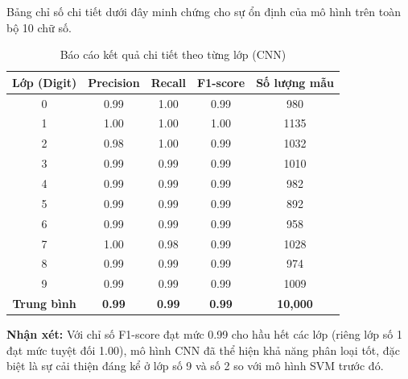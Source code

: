 \documentclass[../DoAn.tex]{subfiles}
\begin{document}
Bảng chỉ số chi tiết dưới đây minh chứng cho sự ổn định của mô hình trên toàn bộ 10 chữ số.

\begin{table}[H]
\centering
\caption{Báo cáo kết quả chi tiết theo từng lớp (CNN)}
\label{tab:cnn_report}
\begin{tabular}{|c|c|c|c|c|}
\hline
\textbf{Lớp (Digit)} & \textbf{Precision} & \textbf{Recall} & \textbf{F1-score} & \textbf{Số lượng mẫu} \\ \hline
0 & 0.99 & 1.00 & 0.99 & 980 \\ \hline
1 & 1.00 & 1.00 & 1.00 & 1135 \\ \hline
2 & 0.98 & 1.00 & 0.99 & 1032 \\ \hline
3 & 0.99 & 0.99 & 0.99 & 1010 \\ \hline
4 & 0.99 & 0.99 & 0.99 & 982 \\ \hline
5 & 0.99 & 0.99 & 0.99 & 892 \\ \hline
6 & 0.99 & 0.99 & 0.99 & 958 \\ \hline
7 & 1.00 & 0.98 & 0.99 & 1028 \\ \hline
8 & 0.99 & 0.99 & 0.99 & 974 \\ \hline
9 & 0.99 & 0.99 & 0.99 & 1009 \\ \hline
\hline
\textbf{Trung bình} & \textbf{0.99} & \textbf{0.99} & \textbf{0.99} & \textbf{10,000} \\ \hline
\end{tabular}
\end{table}

\textbf{Nhận xét:} Với chỉ số F1-score đạt mức 0.99 cho hầu hết các lớp (riêng lớp số 1 đạt mức tuyệt đối 1.00), mô hình CNN đã thể hiện khả năng phân loại tốt, đặc biệt là sự cải thiện đáng kể ở lớp số 9 và số 2 so với mô hình SVM trước đó.
\end{document}
